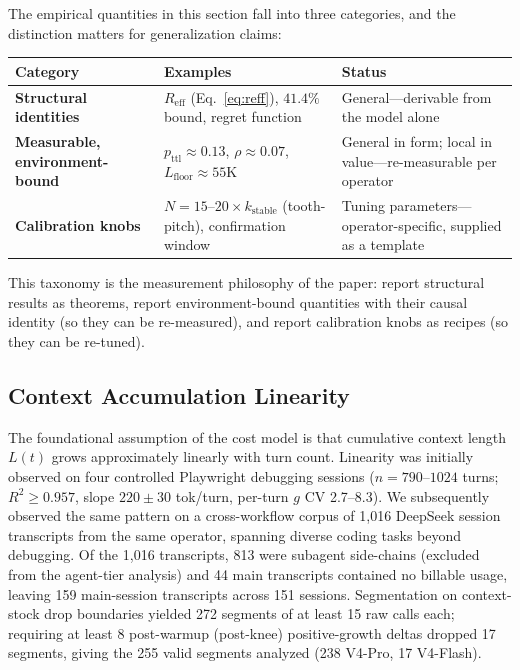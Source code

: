 \documentclass[11pt]{article}
\theoremstyle{definition}
\theoremstyle{remark}
\begin{document}
The empirical quantities in this section fall into three categories, and the distinction matters for generalization claims:

\begin{center}
\small
\begin{tabular}{@{}l p{5.5cm} p{5cm}@{}}
\toprule
Category & Examples & Status \\
\midrule
\textbf{Structural identities} & $R_{\text{eff}}$ (Eq.~\ref{eq:reff}), $41.4\%$ bound, regret function & General---derivable from the model alone \\
\textbf{Measurable, environment-bound} & $p_{\text{ttl}} \approx 0.13$, $\rho \approx 0.07$, $L_{\text{floor}} \approx 55$K & General in form; local in value---re-measurable per operator \\
\textbf{Calibration knobs} & $N = 15$--$20\times k_{\text{stable}}$ (tooth-pitch), confirmation window & Tuning parameters---operator-specific, supplied as a template \\
\bottomrule
\end{tabular}
\end{center}

This taxonomy is the measurement philosophy of the paper: report structural results as theorems, report environment-bound quantities with their causal identity (so they can be re-measured), and report calibration knobs as recipes (so they can be re-tuned).

\subsection{Context Accumulation Linearity}

The foundational assumption of the cost model is that cumulative context length $L(t)$ grows approximately linearly with turn count. Linearity was initially observed on four controlled Playwright debugging sessions ($n = 790$--$1024$ turns; $R^2 \ge 0.957$, slope $220 \pm 30$ tok/turn, per-turn $g$ CV 2.7--8.3). We subsequently observed the same pattern on a cross-workflow corpus of 1,016 DeepSeek session transcripts from the same operator, spanning diverse coding tasks beyond debugging. Of the 1,016 transcripts, 813 were subagent side-chains (excluded from the agent-tier analysis) and 44 main transcripts contained no billable usage, leaving 159 main-session transcripts across 151 sessions. Segmentation on context-stock drop boundaries yielded 272 segments of at least 15 raw calls each; requiring at least 8 post-warmup (post-knee) positive-growth deltas dropped 17 segments, giving the 255 valid segments analyzed (238 V4-Pro, 17 V4-Flash).
\end{document}
